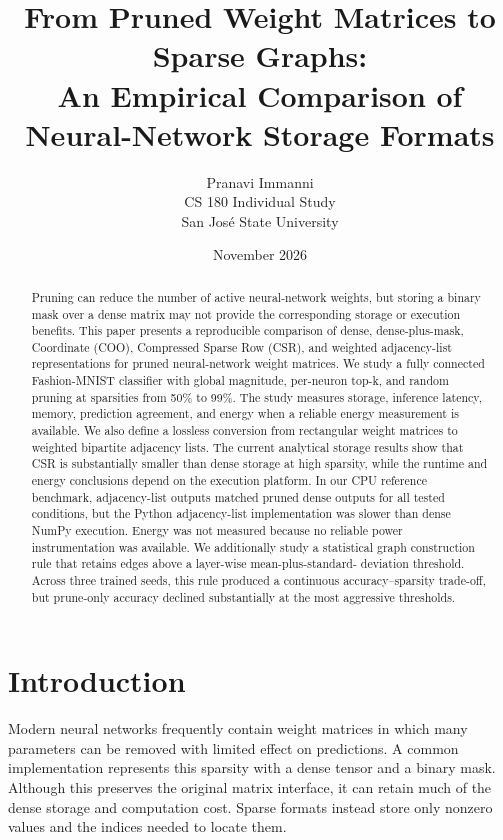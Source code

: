 \documentclass[11pt]{article}
\title{From Pruned Weight Matrices to Sparse Graphs:\\
An Empirical Comparison of Neural-Network Storage Formats}
\author{Pranavi Immanni\\
CS 180 Individual Study\\
San Jos\'e State University}
\date{November 2026}
\begin{document}
\maketitle

\begin{abstract}
Pruning can reduce the number of active neural-network weights, but storing a
binary mask over a dense matrix may not provide the corresponding storage or
execution benefits.  This paper presents a reproducible comparison of dense,
dense-plus-mask, Coordinate (COO), Compressed Sparse Row (CSR), and weighted
adjacency-list representations for pruned neural-network weight matrices.
We study a fully connected Fashion-MNIST classifier with global magnitude,
per-neuron top-k, and random pruning at sparsities from 50\% to 99\%.
The study measures storage, inference latency, memory, prediction agreement,
and energy when a reliable energy measurement is available.  We also define a
lossless conversion from rectangular weight matrices to weighted bipartite
adjacency lists.  The current analytical storage results show that CSR is
substantially smaller than dense storage at high sparsity, while the runtime
and energy conclusions depend on the execution platform.  In our CPU
reference benchmark, adjacency-list outputs matched pruned dense outputs for
all tested conditions, but the Python adjacency-list implementation was slower
than dense NumPy execution.  Energy was not measured because no reliable power
instrumentation was available.  We additionally study a statistical graph
construction rule that retains edges above a layer-wise mean-plus-standard-
deviation threshold.  Across three trained seeds, this rule produced a
continuous accuracy--sparsity trade-off, but prune-only accuracy declined
substantially at the most aggressive thresholds.
\end{abstract}

\section{Introduction}

Modern neural networks frequently contain weight matrices in which many
parameters can be removed with limited effect on predictions.  A common
implementation represents this sparsity with a dense tensor and a binary mask.
Although this preserves the original matrix interface, it can retain much of
the dense storage and computation cost.  Sparse formats instead store only
nonzero values and the indices needed to locate them.
\end{document}

